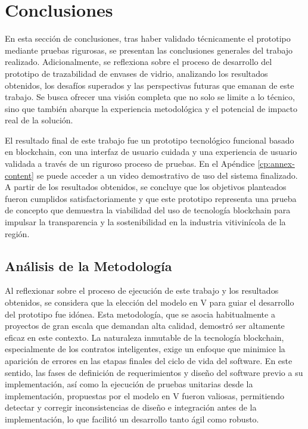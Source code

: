 \chapter[Conclusiones]{Conclusiones}
\label{cp:conclusions}

\parindent0pt

En esta sección de conclusiones, tras haber validado técnicamente el prototipo mediante pruebas rigurosas, se presentan las conclusiones generales del trabajo realizado. Adicionalmente, se reflexiona sobre el proceso de desarrollo del prototipo de trazabilidad de envases de vidrio, analizando los resultados obtenidos, los desafíos superados y las perspectivas futuras que emanan de este trabajo. Se busca ofrecer una visión completa que no solo se limite a lo técnico, sino que también abarque la experiencia metodológica y el potencial de impacto real de la solución.

El resultado final de este trabajo fue un prototipo tecnológico funcional basado en blockchain, con una interfaz de usuario cuidada y una experiencia de usuario validada a través de un riguroso proceso de pruebas. En el Apéndice \ref{cp:annex-content} se puede acceder a un video demostrativo de uso del sistema finalizado. A partir de los resultados obtenidos, se concluye que los objetivos planteados fueron cumplidos satisfactoriamente y que este prototipo representa una prueba de concepto que demuestra la viabilidad del uso de tecnología blockchain para impulsar la transparencia y la sostenibilidad en la industria vitivinícola de la región.

\section{Análisis de la Metodología}

Al reflexionar sobre el proceso de ejecución de este trabajo y los resultados obtenidos, se considera que la elección del modelo en V para guiar el desarrollo del prototipo fue idónea. Esta metodología, que se asocia habitualmente a proyectos de gran escala que demandan alta calidad, demostró ser altamente eficaz en este contexto. La naturaleza inmutable de la tecnología blockchain, especialmente de los contratos inteligentes, exige un enfoque que minimice la aparición de errores en las etapas finales del ciclo de vida del software. En este sentido, las fases de definición de requerimientos y diseño del software previo a su implementación, así como la ejecución de pruebas unitarias desde la implementación, propuestas por el modelo en V fueron valiosas, permitiendo detectar y corregir inconsistencias de diseño e integración antes de la implementación, lo que facilitó un desarrollo tanto ágil como robusto.

